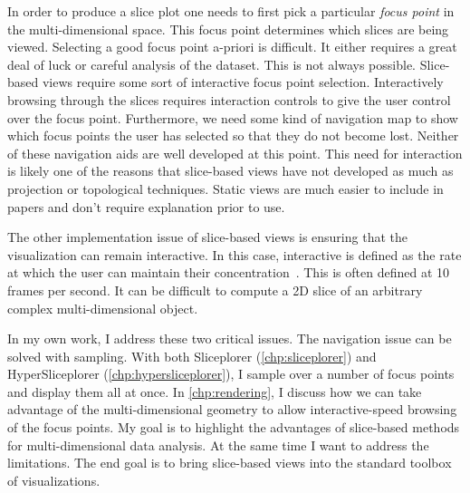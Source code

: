 In order to produce a slice plot one needs to first pick a particular
\emph{focus point} in the multi-dimensional space. This focus point determines
which slices are being viewed. Selecting a good focus point a-priori is
difficult. 
It either requires a great deal of luck or careful analysis of the
dataset. This is not always possible. Slice-based views require some sort of
interactive focus point selection. Interactively browsing through the slices
requires interaction controls to give the user control over the focus point.
Furthermore, we need some kind of navigation map to show which focus points the
user has selected so that they do not become lost. Neither of these navigation
aids are well developed at this point. This need for interaction is likely one
of the reasons that slice-based views have not developed as much as projection
or topological techniques. Static views are much easier to include in papers
and don't require explanation prior to use.

The other implementation issue of slice-based views is ensuring that the
visualization can remain interactive. In this case, interactive is defined as
the rate at which the user can maintain their
concentration~\cite{Shneiderman:1987}. This is often defined at 10 frames per
second. It can be difficult to compute a 2D slice of an arbitrary complex
multi-dimensional object. 

In my own work, I address these two critical issues. The navigation issue can
be solved with sampling. With both Sliceplorer (\autoref{chp:sliceplorer}) and
HyperSliceplorer (\autoref{chp:hypersliceplorer}), I sample over a number of
focus points and display them all at once. In \autoref{chp:rendering}, I
discuss how we can take advantage of the multi-dimensional geometry to allow
interactive-speed browsing of the focus points. My goal is to highlight the
advantages of slice-based methods for multi-dimensional data analysis. At the
same time I want to address the limitations. The end goal is to bring
slice-based views into the standard toolbox of visualizations.




